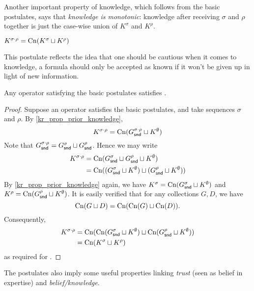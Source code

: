 Another important property of knowledge, which follows from the basic
postulates, says that \emph{knowledge is monotonic}: knowledge after receiving
$\sigma$ and $\rho$ together is just the case-wise union of $K^\sigma$ and
$K^\rho$.

\begin{axiom}[\kconj{}]
    $K^{\sigma \cdot \rho} = \operatorname{Cn}(K^\sigma \sqcup K^\rho)$
\end{axiom}

This postulate reflects the idea that one should be cautious when it comes to
knowledge, a formula should only be accepted as known if it won't be given up
in light of new information.

\begin{proposition}
    \label{kr_prop_kconj}
    Any operator satisfying the basic postulates satisfies \kconj{}.
\end{proposition}

\begin{proof}
    Suppose an operator satisfies the basic postulates, and take sequences
    $\sigma$ and $\rho$. By \cref{kr_prop_prior_knowledge},
    \[
        K^{\sigma \cdot \rho}
        =
        \operatorname{Cn}(G^{\sigma \cdot \rho}_{\mathsf{snd}} \sqcup K^\emptyset)
    \]
    Note that $G^{\sigma \cdot \rho}_{\mathsf{snd}} = G^\sigma_{\mathsf{snd}} \sqcup
    G^\rho_{\mathsf{snd}}$. Hence we may write
    \begin{align*}
        K^{\sigma \cdot \rho}
        &= \operatorname{Cn}(G^\sigma_{\mathsf{snd}} \sqcup G^\rho_{\mathsf{snd}} \sqcup K^\emptyset) \\
        &= \operatorname{Cn}((G^\sigma_{\mathsf{snd}} \sqcup K^\emptyset) \sqcup (G^\rho_{\mathsf{snd}} \sqcup K^\emptyset))
    \end{align*}
    By \cref{kr_prop_prior_knowledge} again, we have $K^\sigma = \operatorname{Cn}(G^\sigma_{\mathsf{snd}}
    \sqcup K^\emptyset)$ and $K^\rho = \operatorname{Cn}(G^\rho_{\mathsf{snd}} \sqcup K^\emptyset)$. It
    is easily verified that for any collections $G, D$, we have
    \[
        \operatorname{Cn}(G \sqcup D) = \operatorname{Cn}(\operatorname{Cn}(G) \sqcup \operatorname{Cn}(D)).
    \]
    Consequently,
    \begin{align*}
        K^{\sigma \cdot \rho}
        &= \operatorname{Cn}(\operatorname{Cn}(G^\sigma_{\mathsf{snd}} \sqcup K^\emptyset) \sqcup \operatorname{Cn}(G^\rho_{\mathsf{snd}} \sqcup K^\emptyset)) \\
        &= \operatorname{Cn}(K^\sigma \sqcup K^\rho)
    \end{align*}
    as required for \kconj{}.
\end{proof}

The postulates also imply some useful properties linking \emph{trust} (seen as
belief in expertise) and \emph{belief/knowledge}.

